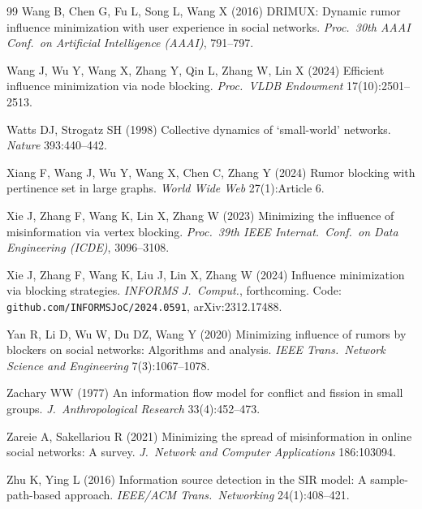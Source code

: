 \documentclass[ASNA,number]{USG}
\begin{document}
\begin{thebibliography}{99}
Wang B, Chen G, Fu L, Song L, Wang X (2016) DRIMUX: Dynamic rumor influence
  minimization with user experience in social networks. \emph{Proc.\ 30th
  AAAI Conf.\ on Artificial Intelligence (AAAI)}, 791--797.

Wang J, Wu Y, Wang X, Zhang Y, Qin L, Zhang W, Lin X (2024) Efficient
  influence minimization via node blocking. \emph{Proc.\ VLDB Endowment}
  17(10):2501--2513.

Watts DJ, Strogatz SH (1998) Collective dynamics of `small-world'
  networks. \emph{Nature} 393:440--442.

Xiang F, Wang J, Wu Y, Wang X, Chen C, Zhang Y (2024) Rumor blocking with
  pertinence set in large graphs. \emph{World Wide Web} 27(1):Article 6.

Xie J, Zhang F, Wang K, Lin X, Zhang W (2023) Minimizing the influence of
  misinformation via vertex blocking. \emph{Proc.\ 39th IEEE Internat.\
  Conf.\ on Data Engineering (ICDE)}, 3096--3108.

Xie J, Zhang F, Wang K, Liu J, Lin X, Zhang W (2024) Influence minimization
  via blocking strategies. \emph{INFORMS J.\ Comput.}, forthcoming. Code:
  \texttt{github.com/INFORMSJoC/2024.0591}, arXiv:2312.17488.

Yan R, Li D, Wu W, Du DZ, Wang Y (2020) Minimizing influence of rumors by
  blockers on social networks: Algorithms and analysis. \emph{IEEE Trans.\
  Network Science and Engineering} 7(3):1067--1078.

Zachary WW (1977) An information flow model for conflict and fission in
  small groups. \emph{J.\ Anthropological Research} 33(4):452--473.

\bibitem[{Zareie and Sakellariou(2021)}]{zareie2021}
Zareie A, Sakellariou R (2021) Minimizing the spread of misinformation in
  online social networks: A survey. \emph{J.\ Network and Computer
  Applications} 186:103094.

Zhu K, Ying L (2016) Information source detection in the SIR model: A
  sample-path-based approach. \emph{IEEE/ACM Trans.\ Networking}
  24(1):408--421.

\end{thebibliography}
\end{document}
